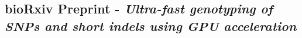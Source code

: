 \begin{appendices}

\section{bioRxiv Preprint - \textit{Ultra-fast genotyping of SNPs and short indels using GPU acceleration}}
\label{appendix:preprint}


\end{appendices}
